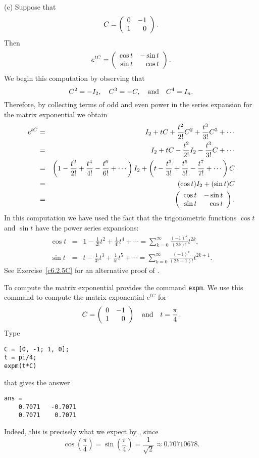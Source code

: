 \noindent (c) \quad Suppose that
     \[
                C = \left(\begin{array}{rr} 0 & -1\\ 1 &0\end{array}\right).
      \]
Then
\begin{equation} \label{e:exprotate}
e^{tC} = \left(\begin{array}{rr} \cos t & -\sin t\\ \sin t &\cos t\end{array}\right).
\end{equation}
We begin this computation by observing that
\[
C^2 = -I_2, \quad C^3 = -C, \quad\mbox{and}\quad C^4 = I_n.
\]
Therefore, by collecting terms of odd and even power in the series
expansion for the matrix exponential we obtain
\begin{eqnarray*}
e^{tC} & = & I_2 + tC + \frac{t^2}{2!} C^2 +  \frac{t^3}{3!}C^3 +\cdots\\
     & = & I_2 + tC - \frac{t^2}{2!}I_2 - \frac{t^3}{3!}C +\cdots\\
     & = & \left(1 - \frac{t^2}{2!} + \frac{t^4}{4!} - \frac{t^6}{6!} +
		\cdots \right)I_2
	 + \left(t - \frac{t^3}{3!} + \frac{t^5}{5!} - \frac{t^7}{7!} +
	\cdots \right)C \\
     & = & (\cos t)I_2 + (\sin t)C \\
     & = & \left(\begin{array}{rr} \cos t & -\sin t\\ \sin t &\cos t\end{array}\right).
     \end{eqnarray*}
In this computation we have used the fact that the trigonometric
functions $\cos t$ and $\sin t$ have the power series expansions:
\begin{eqnarray*}
\cos t & = & 1-\frac{1}{2!}t^2+\frac{1}{4!} t^4 + \cdots =
\sum\limits_{k=0}^\infty\frac{(-1)^k}{(2k)!} t^{2k},\\
\sin t & = & t-\frac{1}{3!} t^3 + \frac{1}{5!} t^5 + \cdots
   = \sum\limits_{k=0}^\infty \frac{(-1)^k}{(2k+1)!} t^{2k+1}.
\end{eqnarray*}
See Exercise~\ref{c6.2.5C} for an alternative proof of .

To compute the matrix exponential
\Matlab{} provides the command
{\tt expm}.  We use this command to compute
the matrix exponential $e^{tC}$ for
\[
C=\left(\begin{array}{rr} 0 & -1\\ 1 &0\end{array}\right) \quad\mbox{and}\quad t=\frac{\pi}{4}.
\]
Type
\begin{verbatim}
C = [0, -1; 1, 0];
t = pi/4;
expm(t*C)
\end{verbatim}
that gives the answer
\begin{verbatim}
ans =
    0.7071   -0.7071
    0.7071    0.7071
\end{verbatim}
Indeed, this is precisely what we expect by ,
since
\[
\cos\left(\frac{\pi}{4}\right)=\sin\left(\frac{\pi}{4}\right)=
\frac{1}{\sqrt{2}}\approx 0.70710678.
\]


